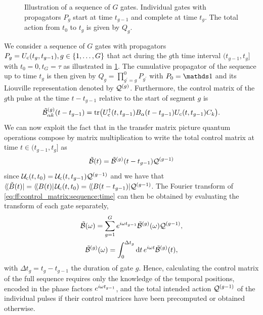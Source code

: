 \begin{figure}
    \centering
    
    \caption[Illustration of gate sequence]{
        Illustration of a sequence of $G$ gates.
        Individual gates with propagators $P_g$ start at time $t_{g-1}$ and complete at time $t_g$.
        The total action from $t_0$ to $t_g$ is given by $Q_g$.
    }
    \label{fig:ff:gatesequence}
\end{figure}

We consider a sequence of $G$ gates with propagators $P_g = U_{\mathrm{c}}(t_g, t_{g-1}), g\in\lbrace 1,\dotsc,G\rbrace$ that act during the $g$th time interval $(t_{g-1}, t_g]$ with $t_0 =  0, t_G = \tau$ as illustrated in \cref{fig:ff:gatesequence}.
The cumulative propagator of the sequence up to time $t_g$ is then given by $Q_g = \prod_{g^\prime=g}^0 P_{g^\prime}$ with $P_0 = \eye$ and its Liouville representation denoted by $\mathcal{Q}^{(g)}$.
Furthermore, the control matrix of the $g$th pulse at the time $t - t_{g-1}$ relative to the start of segment $g$ is
\begin{equation}\label{eq:ff:control_matrix:pulse:time}
    \tilde{\mathcal{B}}^{(g)}_{\alpha k}(t - t_{g-1}) = \tr(U_{\mathrm{c}}^\dagger(t, t_{g-1})B_\alpha(t - t_{g-1}) U_{\mathrm{c}}(t, t_{g-1}) C_k).
\end{equation}
We can now exploit the fact that in the transfer matrix picture quantum operations compose by matrix multiplication to write the total control matrix at time $t\in (t_{g-1}, t_g]$ as
\begin{equation}\label{eq:ff:control_matrix:sequence:time}
    \tilde{\mathcal{B}}(t) = \tilde{\mathcal{B}}^{(g)}(t - t_{g-1})\mathcal{Q}^{(g-1)}
\end{equation}
since $\mathcal{U}_{\mathrm{c}}(t, t_0) = \mathcal{U}_{\mathrm{c}}(t, t_{g-1})\mathcal{Q}^{(g-1)}$ and we have that $\langle\!\langle{\tilde{B}(t)}\rvert = \mbox{\ensuremath{\left\langle\!\bra{B(t)}\right.}}\mathcal{U}_{\mathrm{c}}(t, t_0) \allowbreak = \langle\!\langle{B(t - t_{g-1})}\rvert\mathcal{Q}^{(g-1)}$.
The Fourier transform of \cref{eq:ff:control_matrix:sequence:time} can then be obtained by evaluating the transform of each gate separately,
\begin{gather}
    \tilde{\mathcal{B}}(\omega) = \sum_{g = 1}^G e^{i\omega t_{g-1}}\tilde{\mathcal{B}}^{(g)}(\omega)\mathcal{Q}^{(g-1)} \label{eq:ff:control_matrix:sequence:freq}, \\
    \tilde{\mathcal{B}}^{(g)}(\omega) = \int_0^{\Delta t_g}\dd{t}e^{i\omega t}\tilde{\mathcal{B}}^{(g)}(t), \label{eq:ff:control_matrix:pulse:freq}
\end{gather}
with $\Delta t_g = t_g - t_{g-1}$ the duration of gate $g$.
Hence, calculating the control matrix of the full sequence requires only the knowledge of the temporal positions, encoded in the phase factors $e^{i\omega t_{g-1}}$, and the total intended action $\mathcal{Q}^{(g-1)}$ of the individual pulses if their control matrices have been precomputed or obtained otherwise.
